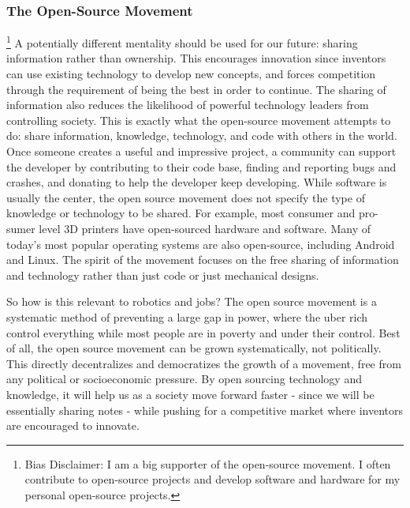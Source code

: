 \subsubsection{The Open-Source Movement} 
\footnote{Bias Disclaimer: I am a big supporter of the open-source movement. I often contribute to open-source projects and develop software and hardware for my personal open-source projects.}
\label{subsec:open-source} 
A potentially different mentality should be used for our future: sharing information rather than ownership. This encourages innovation since inventors can use existing technology to develop new concepts, and forces competition through the requirement of being the best in order to continue. The sharing of information also reduces the likelihood of powerful technology leaders from controlling society. This is exactly what the open-source movement attempts to do: share information, knowledge, technology, and code with others in the world. Once someone creates a useful and impressive project, a community can support the developer by contributing to their code base, finding and reporting bugs and crashes, and donating to help the developer keep developing. While software is usually the center, the open source movement does not specify the type of knowledge or technology to be shared. For example, most consumer and pro-sumer level 3D printers have open-sourced hardware and software. Many of today's most popular operating systems are also open-source, including Android and Linux. The spirit of the movement focuses on the free sharing of information and technology rather than just code or just mechanical designs. %

So how is this relevant to robotics and jobs? The open source movement is a systematic method of preventing a large gap in power, where the uber rich control everything while most people are in poverty and under their control. Best of all, the open source movement can be grown systematically, not politically. This directly decentralizes and democratizes the growth of a movement, free from any political or socioeconomic pressure. By open sourcing technology and knowledge, it will help us as a society move forward faster - since we will be essentially sharing notes - while pushing for a competitive market where inventors are encouraged to innovate. 

